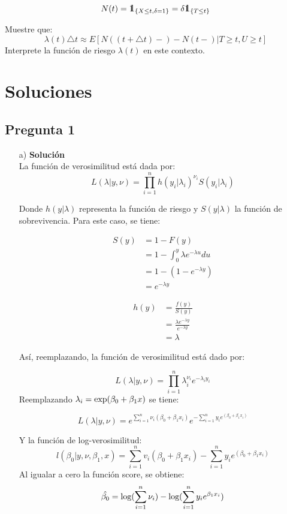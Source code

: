 \documentclass[10pt]{article}\usepackage[]{graphicx}\usepackage[]{color}
\def\one{\mbox{1\hspace{-4.25pt}\fontsize{12}{14.4}\selectfont\textrm{1}}}
\begin{document}
$$N(t)=\one_{\{X\leq t,\delta=1\}}=\delta \one_{\{T\leq t\}}$$

Muestre que:
$$\lambda(t)\triangle t \approx E[N((t+\triangle t)-)-N(t-)|T\geq t, U \geq t]$$
Interprete la función de riesgo $\lambda(t)$ en este contexto.
 
\newpage
\section{Soluciones}
\scriptsize{
\subsection*{Pregunta 1}
\begin{itemize}
\item[a)] \textbf{Solución}\\
La función de verosimilitud está dada por:
$$L(\lambda|y,\nu)=\prod_{i=1}^{n}{h(y_{i}|\lambda_{i})^{\nu_{i}}S(y_{i}|\lambda_{i})}$$

Donde $h(y|\lambda)$ representa la función de riesgo y $S(y|\lambda)$ la función de sobrevivencia. Para este caso, se tiene:

\begin{align*}
S(y) & = 1-F(y) \\
     & = 1-\int_{0}^{y}{\lambda e^{-\lambda u}du} \\
     & = 1-(1-e^{-\lambda y})\\
     & = e^{-\lambda y}
\end{align*}

\begin{align*}
h(y) & =\frac{f(y)}{S(y)}\\
     & = \frac{\lambda e^{-\lambda y}}{e^{-\lambda y}}\\
     & = \lambda
\end{align*}

Así, reemplazando, la función de verosimilitud está dado por: 

$$L(\lambda |y,\nu)=\prod_{i=1}^{n}{\lambda_{i}^{\nu_{i}}e^{-\lambda_{i}y_{i}}}$$
Reemplazando $\lambda_{i}=\textnormal{exp}(\beta_{0}+\beta_{1}x)$ se tiene:

$$L(\lambda|y,\nu)=e^{\sum_{i=1}^{n}{\nu_{i}(\beta_{0}+\beta_{1}x_{i})}}e^{-\sum_{i=1}^{n}{y_{i}e^{(\beta_{0}+\beta_{1}x_{i})}}}$$

Y la función de log-verosimilitud:
$$l(\beta_{0}|y,\nu,\beta_{1},x)=\sum_{i=1}^{n}{v_{i}(\beta_{0}+\beta_{1}x_{i})}-\sum_{i=1}^{n}{y_{i}e^{(\beta_{0}+\beta_{1}x_{i})}}$$
Al igualar a cero la función score, se obtiene:
$$\hat{\beta_{0}}=\textnormal{log}(\sum_{i=1}^{n}{\nu_{i}})-\textnormal{log}(\sum_{i=1}^{n}{y_{i}e^{\beta_{1}x_{i}}})$$


\end{itemize}}
\end{document}
